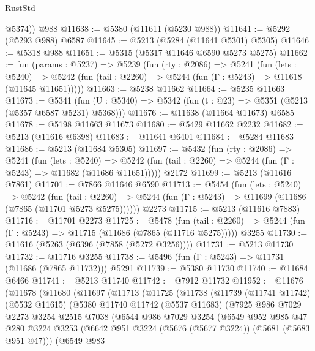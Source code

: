 \begin{lexlean}{RustStd}
\begin{coremodule}
        @5374))
    @988
@11638 := @5380 (@11611 (@5230 @988))
@11641 := @5292 (@5293 @988) @6587
@11645 := @5213 (@5284 (@11641 @5301) @5305)
@11646 := @5318 @988
@11651 := @5315 (@5317 @11646 @6590 @5273 @5275)
@11662 := fun (params : @5237) =>
  @5239
    (fun (rty : @2086) =>
    @5241
      (fun (lets : @5240) =>
      @5242 (fun (tail : @2260) => @5244 (fun (Γ : @5243) => @11618 (@11645 @11651)))))
@11663 := @5238 @11662
@11664 := @5235 @11663
@11673 := @5341
    (fun (U : @5340) => @5342 (fun (t : @23) => @5351 (@5213 (@5357 @6587 @5231) @5368)))
@11676 := @11638 (@11664 @11673) @6585
@11678 := @5198 @11663 @11673
@11680 := @5429 @11662 @2232
@11682 := @5213 (@11616 @6398)
@11683 := @11641 @6401
@11684 := @5284 @11683
@11686 := @5213 (@11684 @5305)
@11697 := @5432
    (fun (rty : @2086) =>
    @5241
      (fun (lets : @5240) =>
      @5242 (fun (tail : @2260) => @5244 (fun (Γ : @5243) => @11682 (@11686 @11651)))))
    @2172
@11699 := @5213 (@11616 @7861)
@11701 := @7866 @11646 @6590
@11713 := @5454
    (fun (lets : @5240) =>
    @5242
      (fun (tail : @2260) =>
      @5244 (fun (Γ : @5243) => @11699 (@11686 (@7865 (@11701 @5273 @5275))))))
    @2273
@11715 := @5213 (@11616 @7883)
@11716 := @11701 @2273
@11725 := @5478
    (fun (tail : @2260) => @5244 (fun (Γ : @5243) => @11715 (@11686 (@7865 (@11716 @5275)))))
    @3255
@11730 := @11616 (@5263 (@6396 (@7858 (@5272 @3256))))
@11731 := @5213 @11730
@11732 := @11716 @3255
@11738 := @5496 (fun (Γ : @5243) => @11731 (@11686 (@7865 @11732))) @5291
@11739 := @5380 @11730
@11740 := @11684 @6466
@11741 := @5213 @11740
@11742 := @7912 @11732
@11952 := @11676
    (@11678
      (@11680
        (@11697
          (@11713
            (@11725
              (@11738
                (@11739
                  (@11741 @11742)
                  (@5532 @11615)
                  (@5380
                    @11740
                    @11742
                    (@5537 @11683)
                    (@7925
                      @986
                      @7029
                      @2273
                      @3254
                      @2515
                      @7038
                      (@6544
                        @986
                        @7029
                        @3254
                        (@6549
                          @952
                          @985
                          @47
                          @280
                          @3224
                          @3253
                          (@6642 @951 @3224 (@5676 (@5677 @3224)) (@5681 (@5683 @951 @47)))
                          (@6549
                            @983

\end{coremodule}
\end{lexlean}
